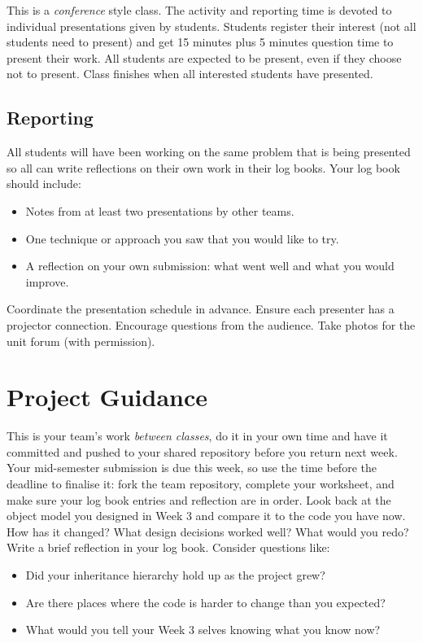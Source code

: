 \documentclass[twoside=false,DIV=14]{scrartcl}
\begin{document}
This is a \emph{conference} style class.  The activity and reporting time is devoted to individual presentations given by students.  Students register their interest (not all students need to present) and get 15 minutes plus 5 minutes question time to present their work.  All students are expected to be present, even if they choose not to present.  Class finishes when all interested students have presented.

\subsection*{Reporting}

All students will have been working on the same problem that is being presented so all can write reflections on their own work in their log books.  Your log book should include:
\begin{itemize}
\itemsep0em
\item Notes from at least two presentations by other teams.
\item One technique or approach you saw that you would like to try.
\item A reflection on your own submission: what went well and what you would improve.
\end{itemize}

\begin{teacher}
Coordinate the presentation schedule in advance.  Ensure each presenter has a projector connection.  Encourage questions from the audience.  Take photos for the unit forum (with permission).
\end{teacher}

\section*{Project Guidance}

This is your team's work \emph{between classes}, do it in your own time and have it committed and pushed to your shared repository before you return next week.  Your mid-semester submission is due this week, so use the time before the deadline to finalise it: fork the team repository, complete your worksheet, and make sure your log book entries and reflection are in order.  Look back at the object model you designed in Week 3 and compare it to the code you have now.  How has it changed?  What design decisions worked well?  What would you redo?  Write a brief reflection in your log book.  Consider questions like:
\begin{itemize}
\itemsep0em
\item Did your inheritance hierarchy hold up as the project grew?
\item Are there places where the code is harder to change than you expected?
\item What would you tell your Week 3 selves knowing what you know now?
\end{itemize}
\end{document}
